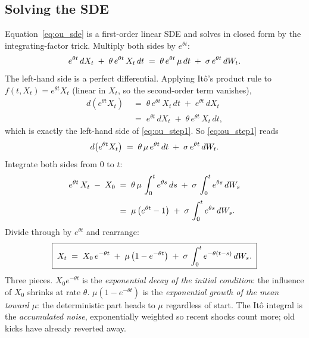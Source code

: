 \subsection{Solving the SDE}
\label{subsec:ch9_solve}

Equation~\eqref{eq:ou_sde} is a first-order linear SDE and solves
in closed form by the integrating-factor trick. Multiply both
sides by $e^{\theta t}$:
\begin{equation}
  e^{\theta t}\,dX_t \;+\; \theta\,e^{\theta t}\,X_t\,dt
  \;=\; \theta\,e^{\theta t}\,\mu\,dt \;+\; \sigma\,e^{\theta t}\,dW_t.
  \label{eq:ou_step1}
\end{equation}
The left-hand side is a perfect differential. Applying It\^o's
product rule to $f(t, X_t) = e^{\theta t} X_t$ (linear in $X_t$,
so the second-order term vanishes),
\begin{align}
  d\!\left(e^{\theta t} X_t\right)
  \;&=\; \theta\,e^{\theta t}\,X_t\,dt
       \;+\; e^{\theta t}\,dX_t \nonumber \\[0.25em]
  \;&=\; e^{\theta t}\,dX_t \;+\; \theta\,e^{\theta t}\,X_t\,dt,
  \label{eq:ou_step2}
\end{align}
which is exactly the left-hand side of \eqref{eq:ou_step1}. So
\eqref{eq:ou_step1} reads
\begin{equation}
  d\!\left(e^{\theta t} X_t\right)
  \;=\; \theta\,\mu\,e^{\theta t}\,dt
  \;+\; \sigma\,e^{\theta t}\,dW_t.
  \label{eq:ou_step3}
\end{equation}
Integrate both sides from $0$ to $t$:
\begin{align}
  e^{\theta t}\,X_t \;-\; X_0
  \;&=\; \theta\,\mu\,\int_0^t e^{\theta s}\,ds
       \;+\; \sigma\,\int_0^t e^{\theta s}\,dW_s \nonumber \\[0.25em]
  \;&=\; \mu\,\bigl(e^{\theta t} - 1\bigr)
       \;+\; \sigma\,\int_0^t e^{\theta s}\,dW_s.
  \label{eq:ou_step4}
\end{align}
Divide through by $e^{\theta t}$ and rearrange:
\begin{equation}
  \boxed{\;
  X_t \;=\; X_0\,e^{-\theta t}
       \;+\; \mu\,\bigl(1 - e^{-\theta t}\bigr)
       \;+\; \sigma\,\int_0^t e^{-\theta(t-s)}\,dW_s.
  \;}
  \label{eq:ou_solution}
\end{equation}
Three pieces. $X_0 e^{-\theta t}$ is the \emph{exponential decay
of the initial condition}: the influence of $X_0$ shrinks at rate
$\theta$. $\mu(1 - e^{-\theta t})$ is the \emph{exponential growth
of the mean toward $\mu$}: the deterministic part heads to $\mu$
regardless of start. The It\^o integral is the \emph{accumulated
noise}, exponentially weighted so recent shocks count more; old
kicks have already reverted away.

